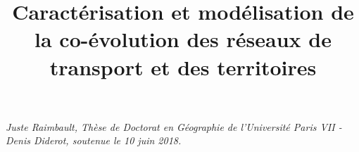 \documentclass[9pt]{article}
\newcommand{\noun}[1]{\textsc{#1}}
\begin{document}
\title{Caractérisation et modélisation de la co-évolution des réseaux de transport et des territoires
}
\author{}

\date{}

\maketitle



\medskip

\textit{Juste Raimbault, Thèse de Doctorat en Géographie de l'Université Paris VII - Denis Diderot, soutenue le 10 juin 2018.}

\medskip


\end{document}
